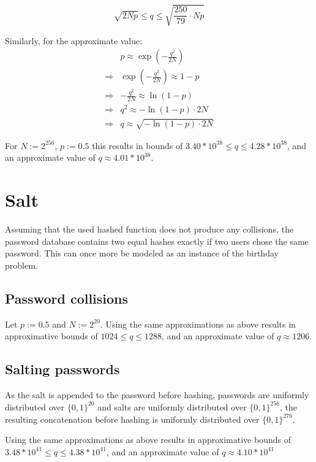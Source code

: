 \documentclass[a4paper]{scrreprt}
\begin{document}
\[
	\sqrt{2 N p} \leq q \leq \sqrt{\frac{250}{79} \cdot N p}
\]

Similarly, for the approximate value:
\begin{align*}
	& p \approx \exp(- \frac{q^2}{2N}) \\
	\Rightarrow & \exp(- \frac{q^2}{2N}) \approx 1 - p \\
	\Rightarrow & -\frac{q^2}{2N} \approx \ln(1 - p) \\
	\Rightarrow & q^2 \approx -\ln(1 - p) \cdot 2N \\
	\Rightarrow & q \approx \sqrt{-\ln(1 - p) \cdot 2N}
\end{align*}

For $N := 2^{256}$, $p := 0.5$ this results in bounds of $3.40 * 10^{38} \leq q
\leq 4.28 * 10^{38}$, and an approximate value of $q \approx 4.01 * 10^{38}$.


\section{Salt}

Assuming that the used hashed function does not produce any collisions, the
password database contains two equal hashes exactly if two users chose the same
password. This can once more be modeled as an instance of the birthday
problem.

\subsection{Password collisions}

Let $p := 0.5$ and $N := 2^{20}$. Using the same approximations as above
results in approximative bounds of $1024 \leq q \leq 1288$, and an approximate
value of $q \approx 1206$.

\subsection{Salting passwords}

As the salt is appended to the password before hashing, passwords are uniformly
distributed over $\{0, 1\}^{20}$ and salts are uniformly distributed over $\{0,
1\}^{256}$, the resulting concatenation before hashing is uniformly distributed
over $\{0, 1\}^{276}$.

Using the same approximations as above results in approximative bounds of $3.48
* 10^{41} \leq q \leq 4.38 * 10^{41}$, and an approximate value of $q \approx
4.10 * 10^{41}$
\end{document}
